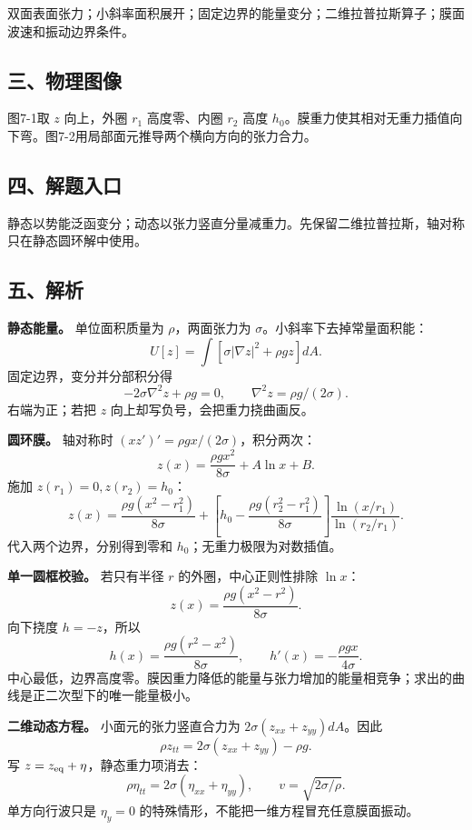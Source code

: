\documentclass[12pt,a4paper,UTF8]{ctexart}
\begin{document}
双面表面张力；小斜率面积展开；固定边界的能量变分；二维拉普拉斯算子；膜面波速和振动边界条件。

\subsection{三、物理图像}\label{ux4e09ux7269ux7406ux56feux50cf-6}

图7-1取 \(z\) 向上，外圈 \(r_1\) 高度零、内圈 \(r_2\) 高度
\(h_0\)。膜重力使其相对无重力插值向下弯。图7-2用局部面元推导两个横向方向的张力合力。

\subsection{四、解题入口}\label{ux56dbux89e3ux9898ux5165ux53e3-6}

静态以势能泛函变分；动态以张力竖直分量减重力。先保留二维拉普拉斯，轴对称只在静态圆环解中使用。

\subsection{五、解析}\label{ux4e94ux89e3ux6790-6}

\textbf{静态能量。} 单位面积质量为 \(\rho\)，两面张力为
\(\sigma\)。小斜率下去掉常量面积能： \[
U[z]=\int\left[\sigma|\nabla z|^2+\rho gz\right]dA.
\] 固定边界，变分并分部积分得 \[
-2\sigma\nabla^2z+\rho g=0,\qquad
\boxed{\nabla^2z=\rho g/(2\sigma)}.
\] 右端为正；若把 \(z\) 向上却写负号，会把重力挠曲画反。

\textbf{圆环膜。} 轴对称时 \((xz')'=\rho gx/(2\sigma)\)，积分两次： \[
z(x)=\frac{\rho gx^2}{8\sigma}+A\ln x+B.
\] 施加 \(z(r_1)=0,z(r_2)=h_0\)： \[
\boxed{z(x)=\frac{\rho g(x^2-r_1^2)}{8\sigma}
+\left[h_0-\frac{\rho g(r_2^2-r_1^2)}{8\sigma}\right]
\frac{\ln(x/r_1)}{\ln(r_2/r_1)}}.
\] 代入两个边界，分别得到零和 \(h_0\)；无重力极限为对数插值。

\textbf{单一圆框校验。} 若只有半径 \(r\) 的外圈，中心正则性排除
\(\ln x\)： \[
z(x)=\frac{\rho g(x^2-r^2)}{8\sigma}.
\] 向下挠度 \(h=-z\)，所以 \[
h(x)=\frac{\rho g(r^2-x^2)}{8\sigma},\qquad
h'(x)=-\frac{\rho gx}{4\sigma}.
\]
中心最低，边界高度零。膜因重力降低的能量与张力增加的能量相竞争；求出的曲线是正二次型下的唯一能量极小。

\textbf{二维动态方程。} 小面元的张力竖直合力为
\(2\sigma(z_{xx}+z_{yy})dA\)。因此 \[
\rho z_{tt}=2\sigma(z_{xx}+z_{yy})-\rho g.
\] 写 \(z=z_{\rm eq}+\eta\)，静态重力项消去： \[
\boxed{\rho\eta_{tt}=2\sigma(\eta_{xx}+\eta_{yy})},
\qquad \boxed{v=\sqrt{2\sigma/\rho}}.
\] 单方向行波只是 \(\eta_y=0\)
的特殊情形，不能把一维方程冒充任意膜面振动。
\end{document}
